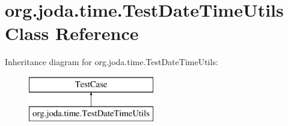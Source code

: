 \hypertarget{classorg_1_1joda_1_1time_1_1_test_date_time_utils}{\section{org.\-joda.\-time.\-Test\-Date\-Time\-Utils Class Reference}
\label{classorg_1_1joda_1_1time_1_1_test_date_time_utils}
}
Inheritance diagram for org.\-joda.\-time.\-Test\-Date\-Time\-Utils\-:\begin{figure}[H]
\begin{center}
\leavevmode
\includegraphics[height=2.000000cm]{classorg_1_1joda_1_1time_1_1_test_date_time_utils}
\end{center}
\end{figure}
